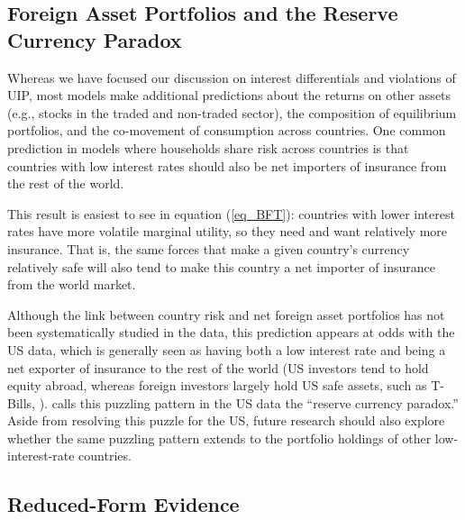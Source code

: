 \documentclass{ar-1col}
\begin{document}
 
\begin{textbox}[h]
\section{Foreign Asset Portfolios and the Reserve Currency Paradox} Whereas we have focused our discussion on interest differentials and violations of UIP, most models make additional predictions about the returns on other assets (e.g., stocks in the traded and non-traded sector), the composition of equilibrium portfolios, and the co-movement of consumption across countries. One common prediction in models where households share risk across countries is that countries with low interest rates should also be net importers of insurance from the rest of the world. 

This result is easiest to see in equation (\ref{eq_BFT}): countries with lower interest rates have more volatile marginal utility, so they need and want relatively more insurance. That is, the same forces that make a given country's currency relatively safe will also tend to make this country a net importer of insurance from the world market. 

Although the link between country risk and net foreign asset portfolios has not been systematically studied in the data, this prediction appears at odds with the US data, which is generally seen as having both a low interest rate and being a net exporter of insurance to the rest of the world (US investors tend to hold equity abroad, whereas foreign investors largely hold US safe assets, such as T-Bills, \citep{GourinchasRey2007,GourinchasGovillotRey2017}). \cite{Maggiori2013} calls this puzzling pattern in the US data the ``reserve currency paradox.'' Aside from resolving this puzzle for the US, future research should also explore whether the same puzzling pattern extends to the portfolio holdings of other low-interest-rate countries. 
\end{textbox}


\subsection{Reduced-Form Evidence}
\end{document}
